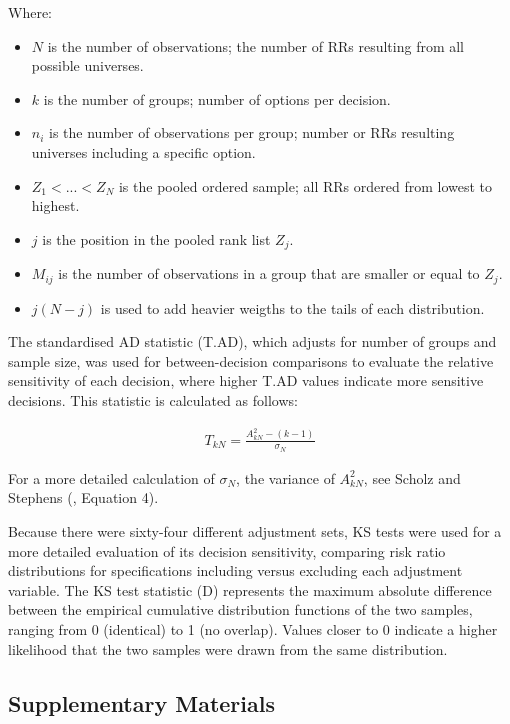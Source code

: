 \documentclass[
  man,
  floatsintext,
  longtable,
  nolmodern,
  notxfonts,
  notimes,
  colorlinks=true,linkcolor=blue,citecolor=blue,urlcolor=blue]{apa7}
\providecommand{\tightlist}{%
  \setlength{\itemsep}{0pt}\setlength{\parskip}{0pt}}
\begin{document}
Where:

\begin{itemize}
\tightlist
\item
  \(N\) is the number of observations; the number of RRs resulting from
  all possible universes.
\item
  \(k\) is the number of groups; number of options per decision.
\item
  \(n_i\) is the number of observations per group; number or RRs
  resulting universes including a specific option.
\item
  \(Z_1 < ... < Z_N\) is the pooled ordered sample; all RRs ordered from
  lowest to highest.
\item
  \(j\) is the position in the pooled rank list \(Z_j\).
\item
  \(M_{ij}\) is the number of observations in a group that are smaller
  or equal to \(Z_j\).
\item
  \(j(N - j)\) is used to add heavier weigths to the tails of each
  distribution.
\end{itemize}

The standardised AD statistic (T.AD), which adjusts for number of groups
and sample size, was used for between-decision comparisons to evaluate
the relative sensitivity of each decision, where higher T.AD values
indicate more sensitive decisions. This statistic is calculated as
follows:

\begin{align}
  T_{kN} = \frac{A_{kN}^2 - (k - 1)}{\sigma_N}
\end{align}

For a more detailed calculation of \(\sigma_N\), the variance of
\(A_{kN}^2\), see Scholz and Stephens
(, Equation 4).

Because there were sixty-four different adjustment sets, KS tests were
used for a more detailed evaluation of its decision sensitivity,
comparing risk ratio distributions for specifications including versus
excluding each adjustment variable. The KS test statistic (D) represents
the maximum absolute difference between the empirical cumulative
distribution functions of the two samples, ranging from 0 (identical) to
1 (no overlap). Values closer to 0 indicate a higher likelihood that the
two samples were drawn from the same distribution.

\subsection{Supplementary Materials}\label{supplementary-materials}
\end{document}
